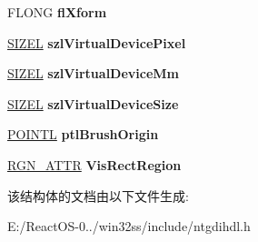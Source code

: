 \begin{DoxyCompactItemize}
F\+L\+O\+NG {\bfseries fl\+Xform}
\item 
\mbox{\label{struct___d_c___a_t_t_r_a26d49f560e042ea8bab5a99a62ef13b2}} 
\hyperlink{structtag_s_i_z_e}{S\+I\+Z\+EL} {\bfseries szl\+Virtual\+Device\+Pixel}
\item 
\mbox{\label{struct___d_c___a_t_t_r_a7e310a3606ef390417f9f50643df3c5b}} 
\hyperlink{structtag_s_i_z_e}{S\+I\+Z\+EL} {\bfseries szl\+Virtual\+Device\+Mm}
\item 
\mbox{\label{struct___d_c___a_t_t_r_a506c9a515a495bc6f70b5d4b5a1deeb3}} 
\hyperlink{structtag_s_i_z_e}{S\+I\+Z\+EL} {\bfseries szl\+Virtual\+Device\+Size}
\item 
\mbox{\label{struct___d_c___a_t_t_r_ac94a5f3b81db1f4ab9f9ac870b1b0e7c}} 
\hyperlink{struct___p_o_i_n_t_l}{P\+O\+I\+N\+TL} {\bfseries ptl\+Brush\+Origin}
\item 
\mbox{\label{struct___d_c___a_t_t_r_af41d868b45179b8b50ad87f09d4fc377}} 
\hyperlink{struct___r_g_n___a_t_t_r}{R\+G\+N\+\_\+\+A\+T\+TR} {\bfseries Vis\+Rect\+Region}
\end{DoxyCompactItemize}


该结构体的文档由以下文件生成\+:\begin{DoxyCompactItemize}
\item 
E\+:/\+React\+O\+S-\/0../win32ss/include/ntgdihdl.\+h\end{DoxyCompactItemize}
